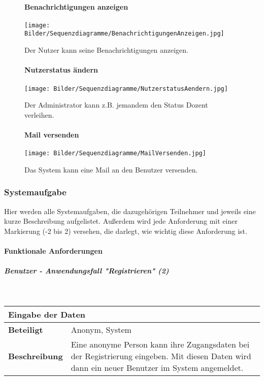 \documentclass[12pt,a4paper]{article}
\begin{document}
\begin{figure}[H]
	\centering
	\paragraph{Benachrichtigungen anzeigen}
	\texttt{[image: Bilder/Sequenzdiagramme/BenachrichtigungenAnzeigen.jpg]}
	\caption{Der Nutzer kann seine Benachrichtigungen anzeigen.}
	\label{SzBenachrichtigungen}
\end{figure}
\begin{figure}[H]
	\centering
	\paragraph{Nutzerstatus ändern}
	\texttt{[image: Bilder/Sequenzdiagramme/NutzerstatusAendern.jpg]}
	\caption{Der Administrator kann z.B. jemandem den Status Dozent verleihen.}
	\label{SzNutzerstatusAendern}
\end{figure}

\begin{figure}[H]
	\centering
	\paragraph{Mail versenden}
	\texttt{[image: Bilder/Sequenzdiagramme/MailVersenden.jpg]}
	\caption{Das System kann eine Mail an den Benutzer versenden.}
	\label{SzMailVersenden}
\end{figure}


\subsubsection{Systemaufgabe}
Hier werden alle Systemaufgaben, die dazugehörigen Teilnehmer und jeweils eine kurze Beschreibung aufgelistet. Außerdem wird jede Anforderung mit einer Markierung (-2 bis 2) versehen, die darlegt, wie wichtig diese Anforderung ist.

\paragraph{Funktionale Anforderungen}
\subparagraph{Benutzer - Anwendungsfall "Registrieren" (2)}\mbox{}\\

\begin{tabular}{l p{10cm}}
\multicolumn{2}{l}{\textbf{Eingabe der Daten}} \\ \hline
\textbf{Beteiligt} & Anonym, System \\ \hline 
\textbf{Beschreibung} & Eine anonyme Person kann ihre Zugangsdaten bei der Registrierung eingeben. Mit diesen Daten wird dann ein neuer Benutzer im System angemeldet.\\ 
\hline 
\end{tabular}\\\\
\end{document}
